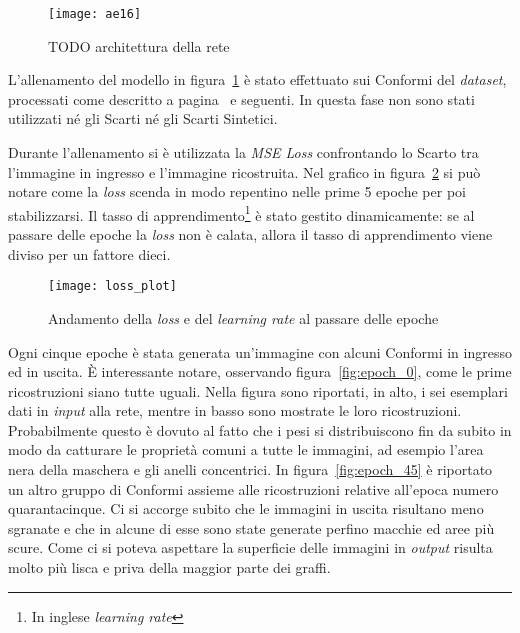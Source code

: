 \begin{figure}[ht]
  \begin{center}
    \texttt{[image: ae16]}
    \caption{TODO architettura della rete}
    \label{fig:ae16_arch}
  \end{center}
\end{figure}

L'allenamento del modello in figura~\ref{fig:ae16_arch} è stato effettuato sui Conformi del \textit{dataset}, processati come descritto a pagina~\pageref{prep} e seguenti.
In questa fase non sono stati utilizzati né gli Scarti né gli Scarti Sintetici.

Durante l'allenamento si è utilizzata la \textit{MSE Loss} confrontando lo Scarto tra l'immagine in ingresso e l'immagine ricostruita.
Nel grafico in figura~\ref{fig:loss_plot} si può notare come la \textit{loss} scenda in modo repentino nelle prime 5 epoche per poi stabilizzarsi.
Il tasso di apprendimento\footnote{In inglese \textit{learning rate}} è stato gestito dinamicamente: se al passare delle epoche la \textit{loss} non è calata, allora il tasso di apprendimento viene diviso per un fattore dieci.

\begin{figure}[ht] %
  \begin{center}
    \texttt{[image: loss\_plot]}
    \caption{Andamento della \textit{loss} e del \textit{learning rate} al passare delle epoche}
    \label{fig:loss_plot}
  \end{center}
\end{figure}

Ogni cinque epoche è stata generata un'immagine con alcuni Conformi in ingresso  ed in uscita.
È interessante notare, osservando figura~\ref{fig:epoch_0}, come le prime ricostruzioni siano tutte uguali.
Nella figura sono riportati, in alto, i sei esemplari dati in \textit{input} alla rete, mentre in basso sono mostrate le loro ricostruzioni.
Probabilmente questo è dovuto al fatto che i pesi si distribuiscono fin da subito in modo da catturare le proprietà comuni a tutte le immagini, ad esempio l'area nera della maschera e gli anelli concentrici.
In figura~\ref{fig:epoch_45} è riportato un altro gruppo di Conformi assieme alle ricostruzioni relative all'epoca numero quarantacinque.
Ci si accorge subito che le immagini in uscita risultano meno sgranate e che in alcune di esse sono state generate perfino macchie ed aree più scure.
Come ci si poteva aspettare la superficie delle immagini in \textit{output} risulta molto più lisca e priva della maggior parte dei graffi.

